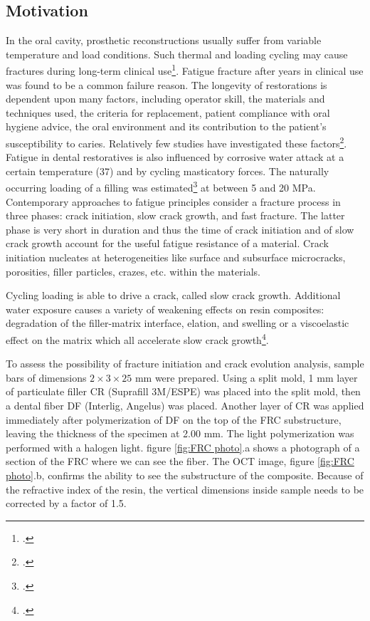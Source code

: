 \documentclass[12pt,twoside,english]{book}
\renewcommand{\~}{\perispomeni}%
\numberwithin{equation}{section}
\numberwithin{figure}{section}
\begin{document}
\subsection{Motivation}

In the oral cavity, prosthetic reconstructions usually suffer from variable temperature and load conditions. Such thermal and loading cycling may cause fractures during long-term clinical use\footcite{Rantala:2003p2481,Lassila:2004p2512}. Fatigue fracture after years in clinical use was found to be a common failure reason. The longevity of restorations is dependent upon many factors, including operator skill, the materials and techniques used, the criteria for replacement, patient compliance with oral hygiene advice, the oral environment and its contribution to the patient\textquoteright{}s susceptibility to caries. Relatively few studies have investigated these factors\footcite{Burke:2001p2517}. Fatigue in dental restoratives is also influenced by corrosive water attack at a certain temperature (37\textdegree{}) and by cycling masticatory forces. The naturally occurring loading of a filling was estimated\footcite{Braem:1994p2520} at between 5 and 20 MPa. Contemporary approaches to fatigue principles consider a fracture process in three phases: crack initiation, slow crack growth, and fast fracture. The latter phase is very short in duration and thus the time of crack initiation and of slow crack growth account for the useful fatigue resistance of a material. Crack initiation nucleates at heterogeneities like surface and subsurface microcracks, porosities, filler particles, crazes, etc. within the materials. 

Cycling loading is able to drive a crack, called slow crack growth. Additional water exposure causes a variety of weakening effects on resin composites: degradation of the filler-matrix interface, elation, and swelling or a viscoelastic effect on the matrix which all accelerate slow crack growth\footcite{Soderholm:1990p2521}. 

To assess the possibility of fracture initiation and crack evolution analysis, sample bars of dimensions $2\times3\times25$ mm were prepared. Using a split mold, 1 mm layer of particulate filler CR (Suprafill 3M/ESPE) was placed into the split mold, then a dental fiber DF (Interlig, Angelus) was placed. Another layer of CR was applied immediately after polymerization of DF on the top of the \gls{FRC} substructure, leaving the thickness of the specimen at 2.00 mm. The light polymerization was performed with a halogen light. figure \ref{fig:FRC photo}.a shows a photograph of a section of the FRC where we can see the fiber. The OCT image, figure \ref{fig:FRC photo}.b, confirms the ability to see the substructure of the composite. Because of the refractive index of the resin, the vertical dimensions inside sample needs to be corrected by a factor of 1.5. 
\end{document}
